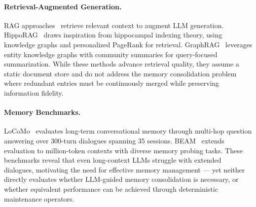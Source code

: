 \paragraph{Retrieval-Augmented Generation.}
RAG approaches~\citep{Gao2023RetrievalAugmentedGF} retrieve relevant context to augment LLM generation.
HippoRAG~\citep{Gutierrez2024HippoRAGNI} draws inspiration from hippocampal indexing theory, using knowledge graphs and personalized PageRank for retrieval.
GraphRAG~\citep{Edge2024FromLT} leverages entity knowledge graphs with community summaries for query-focused summarization.
While these methods advance retrieval quality, they assume a static document store and do not address the memory consolidation problem where redundant entries must be continuously merged while preserving information fidelity.

\paragraph{Memory Benchmarks.}
LoCoMo~\citep{Maharana2024EvaluatingVL} evaluates long-term conversational memory through multi-hop question answering over 300-turn dialogues spanning 35 sessions.
BEAM~\citep{Tavakoli2025BeyondAM} extends evaluation to million-token contexts with diverse memory probing tasks.
These benchmarks reveal that even long-context LLMs struggle with extended dialogues, motivating the need for effective memory management --- yet neither directly evaluates whether LLM-guided memory consolidation is necessary, or whether equivalent performance can be achieved through deterministic maintenance operators.
